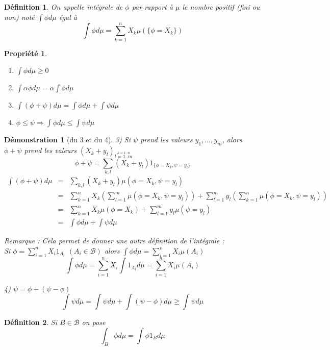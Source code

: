 \documentclass{article}
\theoremstyle{mes_theoremes}
\newtheorem*{Def}{Définition}
\newtheorem{prop}{Propriété}[section]
\newtheorem*{dem}{Démonstration}
\begin{document}
\begin{Def}
On appelle intégrale de $\phi$ par rapport à $\mu$ le nombre positif (fini ou non) noté $\int \phi d\mu$ égal à \[\int \phi d\mu = \sum_{k=1}^n X_k \mu(\{\phi=X_k\})\]
\end{Def}

\begin{prop} \ 
\begin{enumerate}
\item $\int \phi d\mu \geq 0$
\item $\int \alpha \phi d\mu = \alpha \int \phi d\mu$
\item $\int (\phi + \psi) d\mu = \int \phi d\mu + \int \psi d\mu$
\item $\phi \leq \psi \Rightarrow \int \phi d\mu \leq \int \psi d\mu$
\end{enumerate}
\end{prop}

\begin{dem}[du 3 et du 4]
3) Si $\psi$ prend les valeurs $y_1,...,y_m$, alors $\phi + \psi$ prend les valeurs $(X_k + y_l)_{\stackrel{k=1..n}{l=1..m}}$
\[\phi + \psi = \sum_{k,l} (X_k + y_l) 1_{\{\phi=X_k, \psi = y_l\}}\]
\begin{eqnarray*}
\int (\phi + \psi) d\mu &=& \sum_{k,l} (X_k + y_l) \mu(\phi=X_k, \psi = y_l) \\
&=& \sum_{k=1}^n X_k \left( \sum_{l=1}^m \mu(\phi=X_k, \psi=y_l) \right) + \sum_{l=1}^m y_l \left( \sum_{k=1}^n \mu(\phi=X_k, \psi=y_l) \right) \\
&=& \sum_{k=1}^n X_k \mu(\phi=X_k) + \sum_{l=1}^m y_l \mu(\psi=y_l) \\
&=& \int \phi d\mu + \int \psi d\mu
\end{eqnarray*}

Remarque : Cela permet de donner une autre définition de l'intégrale : \\
Si $\phi = \sum_{i=1}^n X_i 1_{A_i}$ $(A_i \in \mathcal{B})$ alors $\int \phi d\mu = \sum_{i=1}^n X_i \mu(A_i)$
\[\int \phi d\mu = \sum_{i=1}^n X_i \int 1_{A_i} d\mu = \sum_{i=1}^n X_i \mu(A_i)\]

4) $\psi = \phi + (\psi - \phi)$ \\
\[\int \psi d\mu = \int \psi d\mu + \int (\psi - \phi) d\mu \geq \int \psi d\mu\]
\end{dem}

\begin{Def}
Si $B \in \mathcal{B}$ on pose \[\int_B \phi d\mu = \int \phi 1_B d\mu\] 
\end{Def}
\end{document}
